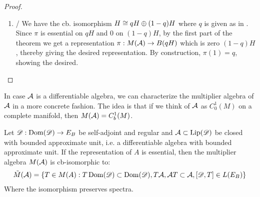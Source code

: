\begin{proof}
\begin{enumerate}
	\item/
		We have the cb. isomorphism $H\cong qH\oplus (1-q)H$ where $q$ is given as in . Since $\pi$ is essential on $qH$ and $0$ on $(1-q)H$, by the first part of the theorem we get a representation $\pi:M(\mathcal{A})\to B(qH)$ which is zero $(1-q)H$, thereby giving the desired representation. By construction, $\pi(1)=q$, showing the desired.
	\end{enumerate}
\end{proof}
In case $\mathcal{A}$ is a differentiable algebra, we can characterize the multiplier algebra of $\mathcal{A}$ in a more concrete fashion. The idea is that if we think of $\mathcal{A}$ as $C_0^1(M)$ on a complete manifold, then $M(\mathcal{A})=C_b^1(M)$. 
\begin{proposition}\label{mesrennie117}
	Let $\mathscr{D}:\operatorname{Dom}(\mathscr{D})\to E_B$ be self-adjoint and regular and $\mathcal{A}\subset \operatorname{Lip}(\mathscr{D})$ be closed with bounded approximate unit, i.e. a differentiable algebra with bounded approximate unit. If the representation of $A$ is essential, then the multiplier algebra $M(\mathcal{A})$ is cb-isomorphic to:
	\begin{align*}
		\tilde{M}(\mathcal{A})=\{T\in M(A) : T\operatorname{Dom}(\mathscr{D})\subset \operatorname{Dom}(\mathscr{D}),T\mathcal{A},\mathcal{A} T\subset \mathcal{A},[\mathscr{D},T]\in L(E_B)\}
	\end{align*}
	Where the isomorphism preserves spectra.
\end{proposition}
